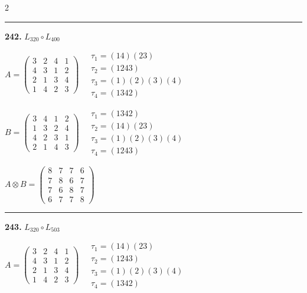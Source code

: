 \begin{multicols}{2}
\vspace{0.3em}
\hrule
\vspace{0.3em}

\noindent\textbf{242.} $L_{320} \circ L_{400}$

$A = \begin{pmatrix} 3 & 2 & 4 & 1 \\ 4 & 3 & 1 & 2 \\ 2 & 1 & 3 & 4 \\ 1 & 4 & 2 & 3 \end{pmatrix} \quad \begin{matrix} \tau_{1}=(1 4)(2 3) \\ \tau_{2}=(1 2 4 3) \\ \tau_{3}=(1)(2)(3)(4) \\ \tau_{4}=(1 3 4 2) \end{matrix}$

$B = \begin{pmatrix} 3 & 4 & 1 & 2 \\ 1 & 3 & 2 & 4 \\ 4 & 2 & 3 & 1 \\ 2 & 1 & 4 & 3 \end{pmatrix} \quad \begin{matrix} \tau_{1}=(1 3 4 2) \\ \tau_{2}=(1 4)(2 3) \\ \tau_{3}=(1)(2)(3)(4) \\ \tau_{4}=(1 2 4 3) \end{matrix}$

$A \otimes B = \begin{pmatrix} 8 & 7 & 7 & 6 \\ 7 & 8 & 6 & 7 \\ 7 & 6 & 8 & 7 \\ 6 & 7 & 7 & 8 \end{pmatrix}$

\vspace{0.3em}
\hrule
\vspace{0.3em}

\noindent\textbf{243.} $L_{320} \circ L_{503}$

$A = \begin{pmatrix} 3 & 2 & 4 & 1 \\ 4 & 3 & 1 & 2 \\ 2 & 1 & 3 & 4 \\ 1 & 4 & 2 & 3 \end{pmatrix} \quad \begin{matrix} \tau_{1}=(1 4)(2 3) \\ \tau_{2}=(1 2 4 3) \\ \tau_{3}=(1)(2)(3)(4) \\ \tau_{4}=(1 3 4 2) \end{matrix}$


\end{multicols}
